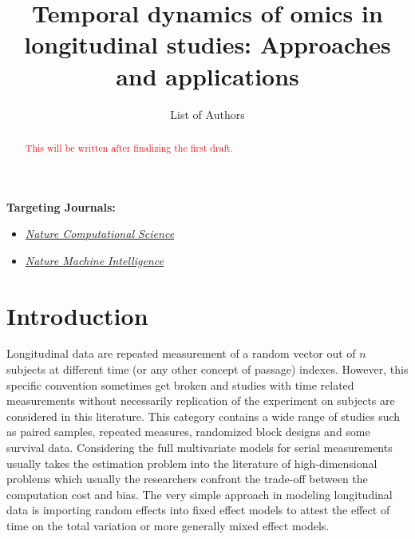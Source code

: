 \documentclass[]{article}
\title{Temporal dynamics of omics in longitudinal studies: Approaches and applications}
\author{List of Authors}
\begin{document}
	\maketitle
	\textbf{Targeting Journals:}
	\begin{itemize}
		\item \href{https://www.nature.com/natmachintell/reviews-and-analysis?type=review-article&year=2023}{\textit{Nature Computational Science}}
		\item  \href{https://www.nature.com/natcomputsci/reviews-and-analysis?type=review-article&year=2023}{\textit{Nature Machine Intelligence}}
	\end{itemize}
	\begin{abstract}
		\textcolor{red}{This will be written after finalizing the first draft.}
	\end{abstract}
	\section{Introduction}
	Longitudinal data are repeated measurement of a random vector out of $n$ subjects at different time (or any other concept of passage) indexes. However, this specific convention sometimes get broken and studies with time related measurements without necessarily replication of the experiment on subjects are considered in this literature. This category contains a wide range of studies such as paired samples, repeated measures, randomized block designs and some survival data. Considering the full multivariate models for serial measurements usually takes the estimation problem into the  literature of high-dimensional problems which usually the researchers confront the trade-off between the computation cost and bias. The very simple approach in modeling longitudinal data is importing random effects into fixed effect models to attest the effect of time on the total variation or more generally mixed effect models. 
	
\end{document}
